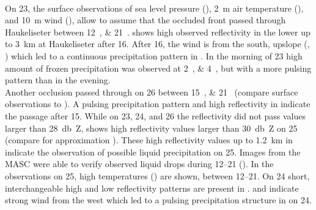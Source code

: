 \\
On \SI{23}{\dec}, the surface observations of sea level pressure (), \SI{2}{\metre} air temperature (), and \SI{10}{\metre} wind (), allow to assume that the occluded front passed through Haukeliseter between \SIlist{12;21}{\UTC}.
 shows high observed reflectivity in the lower up to \SI{3}{\km} at Haukeliseter after \SI{16}{\UTC}.
After \SI{16}{\UTC}, the wind is from the south, upslope (, ) which led to a continuous precipitation pattern in . 
In the morning of \SI{23}{\dec} high amount of frozen precipitation was observed at \SIlist{2;4}{\UTC}, but with a more pulsing pattern than in the evening.
\\
Another occlusion passed through on \SI{26}{\dec} between \SIlist{15;21}{\UTC} (compare surface observations  to ). A pulsing precipitation pattern and high reflectivity in  indicate the passage after \SI{15}{\UTC}. 
While on \num{23}, \num{24}, and \SI{26}{\dec} the reflectivity did not pass values larger than \SI{28}{\decibel Z},  shows high reflectivity values larger than \SI{30}{\decibel Z} on \SI{25}{\dec} (compare for approximation ). 
These high reflectivity values up to \SI{1.2}{\km} in  indicate the observation of possible liquid precipitation on \SI{25}{\dec}. Images from the MASC were able to verify observed liquid drops during \SIrange{12}{21}{\UTC} (). 
In the observations on \SI{25}{\dec}, %
high temperatures () %
are shown, between \SIrange{12}{21}{\UTC}. %
On \SI{24}{\dec} short, interchangeable high and low reflectivity patterns are present in .  and  indicate strong wind from the west which led to a pulsing precipitation structure in  on \SI{24}{\dec}. 
